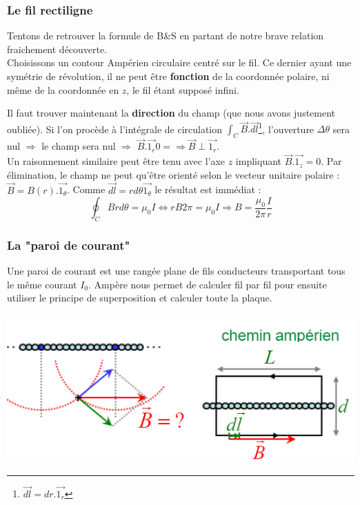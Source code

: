 \documentclass	[11pt, a4paper, openany]{book}
\begin{document}
\subsubsection{Le fil rectiligne}
Tentons de retrouver la formule de B\&S en partant de notre brave relation fraichement découverte.\\

Choisissons un contour Ampérien circulaire centré sur le fil. Ce dernier ayant une symétrie de révolution, il ne peut être \textbf{fonction} de la coordonnée polaire, ni même de la coordonnée en $z$, le fil étant supposé infini.


Il faut trouver maintenant la \textbf{direction} du champ (que nous avons justement oubliée). Si l'on procède à l'intégrale de circulation $\int_C \vec{B}.\vec{dl}$\footnote{$\vec{dl} = dr.\vec{1_r}$}, l'ouverture $\Delta\theta$ sera nul $\Rightarrow$ le champ sera nul $\Rightarrow$ $\vec{B}.\vec{1_r} 0 = \Rightarrow \vec{B} \perp \vec{1_r}$.\\


Un raisonnement similaire peut être tenu avec l'axe $z$ impliquant $\vec{B}.\vec{1_z} = 0$. Par élimination, le champ ne peut qu'être orienté selon le vecteur unitaire polaire : $\vec{B} = B(r).\vec{1_\theta}$. Comme $\vec{dl} = rd\theta\vec{1_\theta}$ le résultat est immédiat :
\begin{equation}
\oint_C Brd\theta = \mu_0 I \Leftrightarrow rB2\pi = \mu_0 I \Rightarrow B = \frac{\mu_0}{2\pi}\frac{I}{r}
\end{equation}



\subsubsection{La "paroi de courant"}
Une paroi de courant est une rangée plane de fils conducteurs transportant tous le même courant $I_0$. Ampère nous permet de calculer fil par fil pour ensuite utiliser le principe de superposition et calculer toute la plaque.

\begin{center}
\includegraphics[scale=0.55]{magneto/image7.png}
\end{center}
\end{document}

